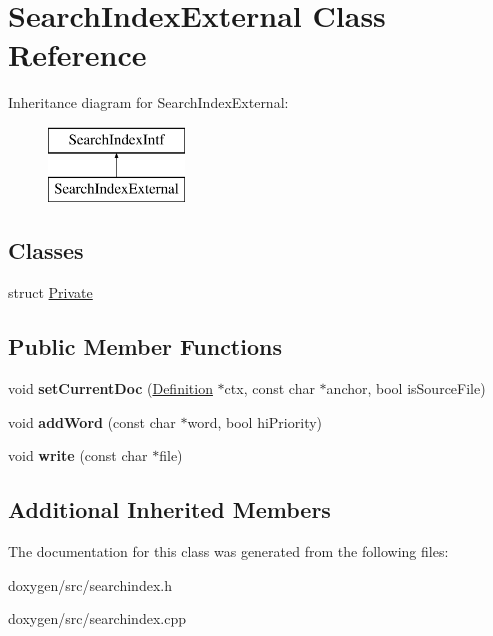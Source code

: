 \hypertarget{class_search_index_external}{}\section{Search\+Index\+External Class Reference}
\label{class_search_index_external}
Inheritance diagram for Search\+Index\+External\+:\begin{figure}[H]
\begin{center}
\leavevmode
\includegraphics[height=2.000000cm]{class_search_index_external}
\end{center}
\end{figure}
\subsection*{Classes}
\begin{DoxyCompactItemize}
\item 
struct \mbox{\hyperlink{struct_search_index_external_1_1_private}{Private}}
\end{DoxyCompactItemize}
\subsection*{Public Member Functions}
\begin{DoxyCompactItemize}
\item 
\mbox{\label{class_search_index_external_adcee9e316b56c1e9ae77c807f0b1db59}} 
void {\bfseries set\+Current\+Doc} (\mbox{\hyperlink{class_definition}{Definition}} $\ast$ctx, const char $\ast$anchor, bool is\+Source\+File)
\item 
\mbox{\label{class_search_index_external_af54cf0b5fb981a1d36c32f8d47b4cfca}} 
void {\bfseries add\+Word} (const char $\ast$word, bool hi\+Priority)
\item 
\mbox{\label{class_search_index_external_a6a3bf5db1a454bb12cac4e3253962206}} 
void {\bfseries write} (const char $\ast$file)
\end{DoxyCompactItemize}
\subsection*{Additional Inherited Members}


The documentation for this class was generated from the following files\+:\begin{DoxyCompactItemize}
\item 
doxygen/src/searchindex.\+h\item 
doxygen/src/searchindex.\+cpp\end{DoxyCompactItemize}
